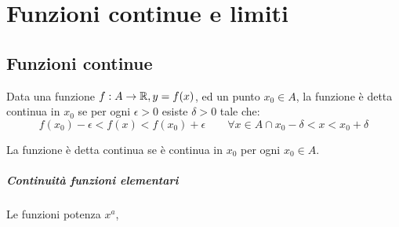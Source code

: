 
\chapter{Funzioni continue e limiti} %

\label{ch:limiti} %


\section{Funzioni continue}

Data una funzione $f:A\rightarrow \mathbb{R}, y = f(x)$, ed un punto $x_0 \in A $, la funzione è detta continua in $x_0$ se per ogni $\epsilon > 0$ esiste $\delta > 0$ tale che:
\[f(x_0)-\epsilon < f(x) < f(x_0) + \epsilon \qquad \forall x \in A \cap x_0 - \delta < x < x_0 + \delta \]

La funzione è detta continua se è continua in $x_0$ per ogni $x_0 \in A$.

\paragraph{Continuità funzioni elementari}
Le funzioni potenza $x^a$, 

